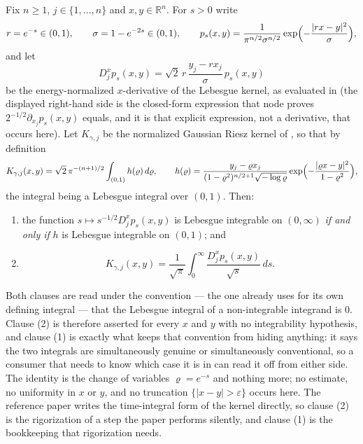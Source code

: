 \begin{lemma}
Fix $n \geq 1$, $j \in \{1,\ldots,n\}$ and $x, y \in \mathbb{R}^n$.  For $s > 0$
write
\[
  r = e^{-s} \in (0,1), \qquad \sigma = 1 - e^{-2s} \in (0,1),
  \qquad
  p_s(x,y) = \frac{1}{\pi^{n/2}\sigma^{n/2}}
      \exp\Bigl(-\frac{|rx-y|^2}{\sigma}\Bigr) ,
\]
and let
\[
  D_j^x p_s(x,y) = \sqrt2\,r\,\frac{y_j - r x_j}{\sigma}\,p_s(x,y)
\]
be the energy-normalized $x$-derivative of the Lebesgue kernel, as evaluated in
 (the displayed right-hand side is the
closed-form expression that node proves $2^{-1/2}\partial_{x_j}p_s(x,y)$ equals,
and it is that explicit expression, not a derivative, that occurs here).  Let
$K_{\gamma,j}$ be the normalized Gaussian Riesz kernel of
, so that by definition
\[
  K_{\gamma,j}(x,y)
    = \sqrt2\,\pi^{-(n+1)/2}\int_{(0,1)} h(\varrho)\,d\varrho,
  \qquad
  h(\varrho)
    = \frac{y_j - \varrho x_j}
        {(1-\varrho^2)^{n/2+1}\sqrt{-\log\varrho}}
      \exp\Bigl(-\frac{|\varrho x-y|^2}{1-\varrho^2}\Bigr) ,
\]
the integral being a Lebesgue integral over $(0,1)$.  Then:
\begin{enumerate}
\item the function $s \mapsto s^{-1/2}D_j^xp_s(x,y)$ is Lebesgue integrable on
$(0,\infty)$ \emph{if and only if} $h$ is Lebesgue integrable on $(0,1)$; and
\item
\[
  K_{\gamma,j}(x,y)
    = \frac{1}{\sqrt\pi}\int_0^\infty \frac{D_j^xp_s(x,y)}{\sqrt s}\,ds .
\]
\end{enumerate}

Both clauses are read under the convention --- the one
 already uses for its own defining integral --- that
the Lebesgue integral of a non-integrable integrand is $0$.  Clause (2) is
therefore asserted for every $x$ and $y$ with no integrability hypothesis, and
clause (1) is exactly what keeps that convention from hiding anything: it says
the two integrals are simultaneously genuine or simultaneously conventional, so
a consumer that needs to know which case it is in can read it off from either
side.  The identity is the change of variables $\varrho = e^{-s}$ and nothing
more; no estimate, no uniformity in $x$ or $y$, and no truncation
$\{|x-y|>\varepsilon\}$ occurs here.  The reference paper writes the time-integral
form of the kernel directly, so clause (2) is the rigorization of a step the
paper performs silently, and clause (1) is the bookkeeping that rigorization
needs.
\end{lemma}

